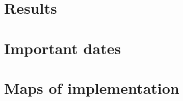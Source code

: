 \documentclass[10pt]{article}
\begin{document}
\pagebreak

\clearpage\section{Results}













\appendix

\clearpage\section{Important dates}\label{sec:dates}



\section{Maps of implementation}
\end{document}
